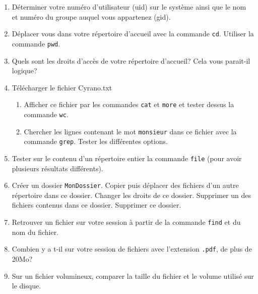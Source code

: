 \documentclass[a4paper,11pt]{exam}
\begin{document}


{
      \begin{enumerate}
	\item Déterminer votre numéro d’utilisateur (uid) sur le système ainsi que le nom et numéro du groupe auquel vous appartenez (gid).
	  \item Déplacer vous dans votre répertoire d’accueil avec la commande \texttt{cd}. Utiliser la commande \texttt{pwd}.
	  \item Quels sont les droits d'accès de votre répertoire d’accueil? Cela vous parait-il logique?
	  \item Télécharger le fichier Cyrano.txt
	    \begin{enumerate}
	    \item Afficher ce fichier par les commandes \texttt{cat} et \texttt{more} et tester dessus la commande \texttt{wc}.
	    \item Chercher les lignes contenant le mot \texttt{monsieur} dans ce fichier avec la commande \texttt{grep}. Tester les différentes options.
	    \end{enumerate}
	  \item Tester sur le contenu d'un répertoire entier la commande \texttt{file} (pour avoir plusieurs résultats différents).
	\item Créer un dossier \texttt{MonDossier}. Copier puis déplacer des fichiers d'un autre répertoire dans ce dossier. Changer les droits de ce dossier. Supprimer un des fichiers contenus dans ce dossier. Supprimer ce dossier.
	\item Retrouver un fichier sur votre session à partir de la commande \texttt{find} et du nom du fichier.
	\item Combien y a t-il sur votre session de fichiers avec l'extension \texttt{.pdf}, de plus de 20Mo?
      \item Sur un fichier volumineux, comparer la taille du fichier et le volume utilisé sur le disque.
      \end{enumerate}
}
\end{document}
